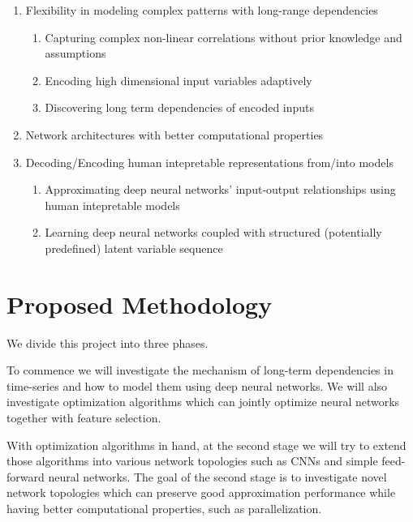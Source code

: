 \documentclass{article} \usepackage{tabularx}
\begin{document}
\begin{enumerate}
\item Flexibility in modeling complex patterns with long-range
  dependencies
  \begin{enumerate}
  \item Capturing complex non-linear correlations without prior
    knowledge and assumptions
  \item Encoding high dimensional input variables adaptively
  \item Discovering long term dependencies of encoded inputs
  \end{enumerate}
\item Network architectures with better computational properties
\item Decoding/Encoding human intepretable representations
  from/into models
  \begin{enumerate}
  \item Approximating deep neural networks' input-output
    relationships using human intepretable models
  \item Learning deep neural networks coupled with structured
    (potentially predefined) latent variable sequence
  \end{enumerate}
\end{enumerate}


\section{Proposed Methodology}
\label{sec:method}

We divide this project into three phases.

To commence we will investigate the mechanism of long-term
dependencies in time-series and how to model them using deep
neural networks. We will also investigate optimization algorithms
which can jointly optimize neural networks together with feature
selection.

With optimization algorithms in hand, at the second stage we will
try to extend those algorithms into various network topologies
such as CNNs and simple feed-forward neural networks. The goal of
the second stage is to investigate novel network topologies which
can preserve good approximation performance while having better
computational properties, such as parallelization.
\end{document}
